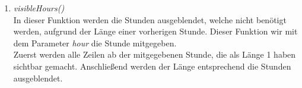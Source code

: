 \begin{enumerate}
	\item \textit{visibleHours()}\\
	In dieser Funktion werden die Stunden ausgeblendet, welche nicht benötigt werden, aufgrund der Länge einer vorherigen Stunde. Dieser Funktion wir mit dem Parameter \textit{hour} die Stunde mitgegeben.\\
	Zuerst werden alle Zeilen ab der mitgegebenen Stunde, die als Länge 1 haben sichtbar gemacht. Anschließend werden der Länge entsprechend die Stunden ausgeblendet.
	
	
	
\end{enumerate}

